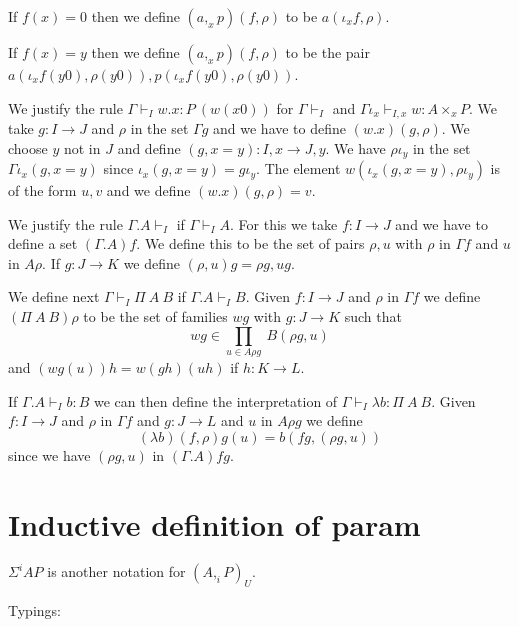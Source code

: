 \documentclass[10pt,a4paper]{article}
\newcommand\CSig[1]{\Sigma^{#1}}
\newcommand{\Prod}[2]{\displaystyle\prod _{#1}~#2}
\begin{document}
 If $f(x) = 0$ then we define $(a,_xp)(f,\rho)$ to be $a(\iota_xf,\rho)$.

 If $f(x) = y$ then we define $(a,_x p)(f,\rho)$ to be the pair $a(\iota_xf(y0),\rho(y0)),p(\iota_xf(y0),\rho(y0))$.

\medskip

 We justify the rule $\Gamma\vdash_I w.x:P~(w(x0))$ for $\Gamma\vdash_I$
and $\Gamma\iota_x\vdash_{I,x} w:A\times_x P$. We take $g:I\rightarrow J$ and
$\rho$ in the set $\Gamma g$ and we have to define $(w.x)(g,\rho)$.
We choose $y$ not in $J$ and define $(g,x=y):I,x\rightarrow J,y$.
We have $\rho\iota_y$ in the set $\Gamma\iota_x (g,x=y)$ since
$\iota_x (g,x=y) = g\iota_y$. The element $w(\iota_x (g,x=y),\rho\iota_y)$ is of the form
$u,v$ and we define $(w.x)(g,\rho) = v$.

\medskip

 We justify the rule $\Gamma.A\vdash_I$ if $\Gamma\vdash_I A$. For this we take
$f:I\rightarrow J$ and we have to define a set $(\Gamma.A)f$. We define this to be
the set of pairs $\rho,u$ with $\rho$ in $\Gamma f$ and $u$ in $A\rho$.
If $g:J\rightarrow K$ we define $(\rho,u)g = \rho g,ug$.

 We define next $\Gamma\vdash_I \Pi~A~B$ if $\Gamma.A\vdash_I B$. Given $f:I\rightarrow J$
and $\rho$ in $\Gamma f$ we define $(\Pi~A~B)\rho$ to be the set of families
$wg$ with $g:J\rightarrow K$ such that
$$
wg\in \Prod{u\in A\rho g}{B(\rho g,u)}
$$
and $(wg(u))h = w(gh)(uh)$ if $h:K\rightarrow L$.

 If $\Gamma.A\vdash _I b:B$ we can then define the interpretation of
$\Gamma\vdash_I \lambda b:\Pi~A~B$. Given $f:I\rightarrow J$ and
$\rho$ in $\Gamma f$ and $g:J\rightarrow L$ and $u$ in $A\rho g$ we define 
$$
(\lambda b)(f,\rho) g(u) = b(fg,(\rho g,u))
$$
since we have $(\rho g,u)$ in $(\Gamma.A)fg$.


\section{Inductive definition of param}

$\CSig i A P$ is another notation for $(A ,_i P)_U$.

Typings:
\begin{mathpar}

\end{mathpar}
\end{document}
